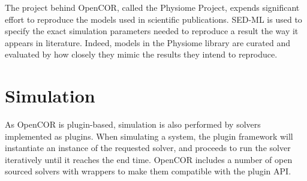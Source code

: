 \documentclass[\rootfolder/main.tex]{subfiles}
\begin{document}
The project behind OpenCOR, called the Physiome Project, expends significant effort to reproduce the models used in scientific publications.
SED-ML is used to specify the exact simulation parameters needed to reproduce a result the way it appears in literature.
Indeed, models in the Physiome library are curated and evaluated by how closely they mimic the results they intend to reproduce.

\section{Simulation}

As OpenCOR is plugin-based, simulation is also performed by solvers implemented as plugins.
When simulating a system, the plugin framework will instantiate an instance of the requested solver, and proceeds to run the solver iteratively until it reaches the end time.
OpenCOR includes a number of open sourced solvers with wrappers to make them compatible with the plugin API.
\end{document}

